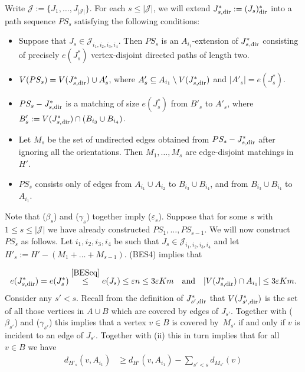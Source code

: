 \documentclass{memo-l}
\def\COMMENT#1{}
\def\eps{\varepsilon}
\def\I{i_1,i_2,i_3,i_4}
\numberwithin{section}{chapter}
\numberwithin{equation}{section}
\numberwithin{firstthm}{section}
\numberwithin{figure}{section}
\begin{document}
{Write $\mathcal{J} := \{ J_1, \dots, J_{|\mathcal{J}|} \}$.
For each $s \le |\mathcal{J}|$, we will extend $J^*_{s,{\rm dir}}:=(J_s)^*_{\rm dir}$ into a path sequence $PS_s$ satisfying the following conditions:
\begin{itemize}
	\item[\rm ($\alpha_s$)] Suppose that $J_s \in \mathcal{J}_{\I}$.
Then $PS_s$ is an $A_{i_1}$-extension of $J^*_{s,{\rm dir}}$ consisting of precisely $e(J^*_{s})$ vertex-disjoint directed paths of length two.
	\item[\rm ($\beta_s$)] $V(PS_s) = V(J^*_{s,{\rm dir}}) \cup A'_s$, where $A'_s \subseteq A_{i_1} \setminus V(J^*_{s,{\rm dir}})$ and $|A'_s| = e(J^*_{s})$. 
	\item[\rm ($\gamma_s$)] $PS_s - J^*_{s,{\rm dir}}$ is a matching of size $e(J^*_{s})$ from $B'_s$ to $A'_s$, where $B'_s := V(J^*_{s,{\rm dir}}) \cap (B_{i_3} \cup B_{i_4})$.
	\item[\rm ($\delta_s$)] Let $M_s$ be the set of undirected edges obtained from $PS_s - J^*_{s,{\rm dir}}$ after ignoring all the orientations.
	Then $M_1, \dots, M_s$ are edge-disjoint matchings in $H'$.	
	\item[\rm ($\eps_s$)] $PS_s$ consists only of	edges from $A_{i_1} \cup A_{i_2}$ to $B_{i_3} \cup B_{i_4}$,  and 
from $B_{i_3} \cup B_{i_4}$ to $A_{i_1}$.
\end{itemize}
Note that ($\beta_s$) and ($\gamma_s$) together imply ($\eps_s$).
Suppose that for some $s$ with $1\le s \le |\mathcal{J}|$ we have already constructed $PS_1, \dots, PS_{s-1}$. We will now construct $PS_s$ as follows.
Let $\I$ be such that $J_s \in \mathcal{J}_{\I}$ and let  $H'_s:=H'-(M_1+ \dots +M_{s-1})$.
(BES4) implies that%
\COMMENT{Allan: added stackrel \eqref{BESeq}}
\begin{align}
e( J^*_{s, {\rm dir}} ) = e( J^*_s ) \stackrel{\eqref{BESeq}}{\le} e(J_s) \le \eps n \le 3 \eps K m 
\quad
\text{and}
\quad
|V(J^*_{s,{\rm dir}}) \cap A_{i_1}| \le 3\eps K m .
\label{J^*}
\end{align}
Consider any $s' < s$. Recall from the definition of $J^*_{s',{\rm dir}}$ that $V(J^*_{s',{\rm dir}})$ is the set of all those
vertices in $A\cup B$ which are covered by edges of $J_{s'}$. Together with ($\beta_{s'}$) and ($\gamma_{s'}$) this implies that
a vertex $v \in B$ is covered by~$M_{s'}$ if and only if $v$ is incident to an edge of $J_{s'}$.
Together with (ii) this in turn implies that for all $v \in B$ we have
\begin{align*}
d_{H'_s}( v , A_{i_1} ) & \ge  d_{H'}( v , A_{i_1} ) - \sum_{s' < s} d_{ M_{s'}}(v) 

\end{align*}}
\end{document}
